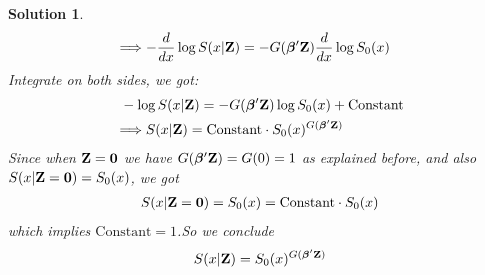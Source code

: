 \documentclass[11pt]{article}
\newtheorem{sol}{Solution}
\begin{document}
\begin{sol}
\begin{align*}
		&\Longrightarrow -\frac{d}{dx}\log S(x|{\bf Z}) = -G({\bm \beta}'{\bf Z})\frac{d}{dx}\log S_0(x)
	\end{align*}
	Integrate on both sides, we got:
	\begin{align*}
		&\ -\log S(x|{\bf Z}) = -G({\bm \beta}'{\bf Z})\log S_0(x) + \text{Constant}\\
		&\Longrightarrow S(x|{\bf Z}) = \text{Constant}\cdot S_0(x)^{G({\bm \beta}'{\bf Z})}
	\end{align*}
	Since when ${\bf Z} = {\bf 0}$ we have $G({\bm \beta}'{\bf Z}) = G(0) = 1$ as explained before, and also $S(x|{\bf Z} ={\bf 0}) = S_0(x)$, we got
	\begin{align*}
		S(x|{\bf Z} = {\bf 0}) = S_0(x) = \text{Constant}\cdot S_0(x)
	\end{align*}
	which implies $\text{Constant} = 1$.So we conclude
	\begin{align*}
		S(x|{\bf Z}) = S_0(x)^{G({\bm \beta}'{\bf Z})}
	\end{align*}
\end{sol}
\end{document}
